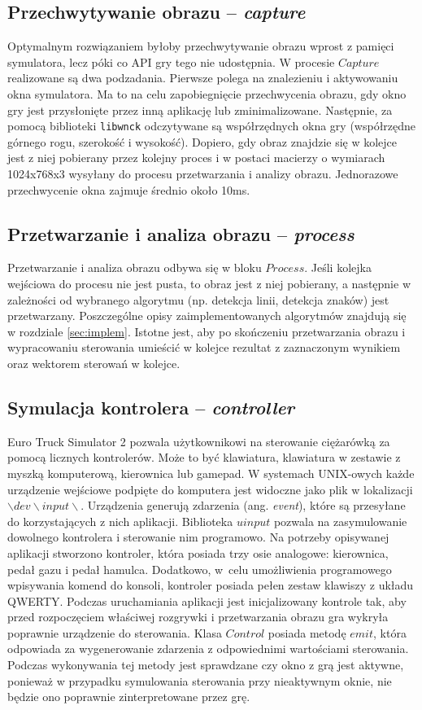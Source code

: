 \subsection{Przechwytywanie obrazu -- \textit{capture}}
\label{sec:mechanism}
Optymalnym rozwiązaniem byłoby przechwytywanie obrazu wprost z pamięci symulatora, lecz póki co API gry tego nie udostępnia. 
W procesie $Capture$ realizowane są dwa podzadania. 
Pierwsze polega na znalezieniu i aktywowaniu okna symulatora. 
Ma to na celu zapobiegnięcie przechwycenia obrazu, gdy okno gry jest przysłonięte przez inną aplikację lub zminimalizowane. 
Następnie, za pomocą biblioteki \texttt{libwnck} odczytywane są współrzędnych okna gry (współrzędne górnego rogu, szerokość i wysokość). 
Dopiero, gdy obraz znajdzie się w kolejce jest z niej pobierany przez kolejny proces i w postaci macierzy o wymiarach 1024x768x3 wysyłany do procesu przetwarzania i analizy obrazu. 
Jednorazowe przechwycenie okna zajmuje średnio około 10ms.

\subsection{Przetwarzanie i analiza obrazu -- \textit{process}}
Przetwarzanie i analiza obrazu odbywa się w bloku $Process$.
Jeśli kolejka wejściowa do procesu nie jest pusta, to obraz jest z niej pobierany, a następnie w zależności od wybranego algorytmu (np. detekcja linii, detekcja znaków) jest przetwarzany. 
Poszczególne opisy zaimplementowanych algorytmów znajdują się w rozdziale \ref{sec:implem}. 
Istotne jest, aby po skończeniu przetwarzania obrazu i wypracowaniu sterowania umieścić w kolejce rezultat z zaznaczonym wynikiem oraz wektorem sterowań w kolejce. 

\subsection{Symulacja kontrolera -- \textit{controller}}
Euro Truck Simulator 2 pozwala użytkownikowi na sterowanie ciężarówką za pomocą licznych kontrolerów. 
Może to być klawiatura, klawiatura w zestawie z myszką komputerową, kierownica lub gamepad. 
W systemach UNIX-owych każde urządzenie wejściowe podpięte do komputera jest widoczne jako plik w lokalizacji $\backslash dev\backslash input\backslash $. 
Urządzenia generują zdarzenia (ang. \textit{event}), które są przesyłane do korzystających z nich aplikacji.
Biblioteka $uinput$ pozwala na zasymulowanie dowolnego kontrolera i sterowanie nim programowo. 
Na potrzeby opisywanej aplikacji stworzono kontroler, która posiada trzy osie analogowe: kierownica, pedał gazu i pedał hamulca. 
Dodatkowo, w~celu umożliwienia programowego wpisywania komend do konsoli, kontroler posiada pełen zestaw klawiszy z układu QWERTY. 
Podczas uruchamiania aplikacji jest inicjalizowany kontrole tak, aby przed rozpoczęciem właściwej rozgrywki i przetwarzania obrazu gra wykryła poprawnie urządzenie do sterowania. 
Klasa $Control$ posiada metodę $emit$, która odpowiada za wygenerowanie zdarzenia z odpowiednimi wartościami sterowania. 
Podczas wykonywania tej metody jest sprawdzane czy okno z grą jest aktywne, ponieważ w przypadku symulowania sterowania przy nieaktywnym oknie, nie będzie ono poprawnie zinterpretowane przez grę. 

